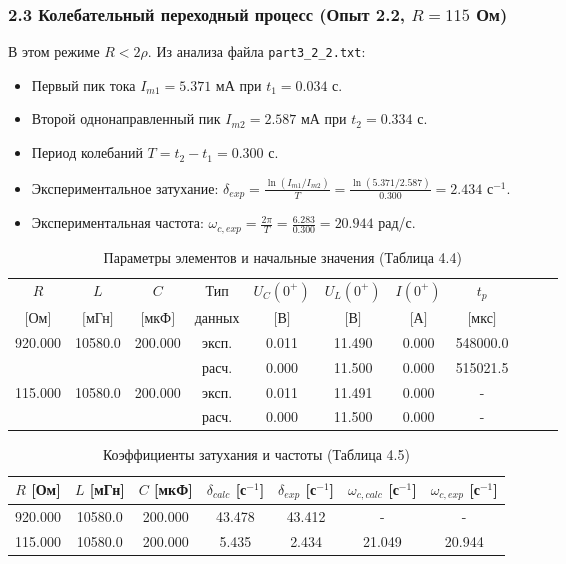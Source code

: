 \documentclass[a4paper,12pt]{article}
\begin{document}
\subsubsection*{2.3 Колебательный переходный процесс (Опыт 2.2, $R = 115$ Ом)}
В этом режиме $R < 2\rho$. Из анализа файла \texttt{part3\_2\_2.txt}:
\begin{itemize}
    \item Первый пик тока $I_{m1} = 5.371$ мА при $t_1 = 0.034$ с.
    \item Второй однонаправленный пик $I_{m2} = 2.587$ мА при $t_2 = 0.334$ с.
    \item Период колебаний $T = t_2 - t_1 = 0.300$ с.
    \item Экспериментальное затухание: $\delta_{exp} = \frac{\ln(I_{m1}/I_{m2})}{T} = \frac{\ln(5.371/2.587)}{0.300} = 2.434$ с$^{-1}$.
    \item Экспериментальная частота: $\omega_{c,exp} = \frac{2\pi}{T} = \frac{6.283}{0.300} = 20.944$ рад/с.
\end{itemize}

\begin{table}[H]
\centering
\caption{Параметры элементов и начальные значения (Таблица 4.4)}
\begin{tabular}{|c|c|c|c|c|c|c|c|c|c|c|}
\hline
$R$ & $L$ & $C$ & Тип & $U_C(0^+)$ & $U_L(0^+)$ & $I(0^+)$ & $t_p$ \\
$[$Ом$]$ & $[$мГн$]$ & $[$мкФ$]$ & данных & $[$В$]$ & $[$В$]$ & $[$А$]$ & $[$мкс$]$ \\
\hline
920.000 & 10580.0 & 200.000 & эксп. & 0.011 & 11.490 & 0.000 & 548000.0 \\
\hline
 &  &  & расч. & 0.000 & 11.500 & 0.000 & 515021.5 \\ 
\hline
115.000 & 10580.0 & 200.000 & эксп. & 0.011 & 11.491 & 0.000 & - \\
\hline
 &  &  & расч. & 0.000 & 11.500 & 0.000 & - \\
\hline
\end{tabular}
\end{table}

\begin{table}[H]
\centering
\caption{Коэффициенты затухания и частоты (Таблица 4.5)}
\begin{tabular}{|c|c|c|c|c|c|c|}
\hline
$R$ [Ом] & $L$ [мГн] & $C$ [мкФ] & $\delta_{calc}$ [с$^{-1}$] & $\delta_{exp}$ [с$^{-1}$] & $\omega_{c,calc}$ [с$^{-1}$] & $\omega_{c,exp}$ [с$^{-1}$] \\
\hline
920.000 & 10580.0 & 200.000 & 43.478 & 43.412 & - & - \\
\hline
115.000 & 10580.0 & 200.000 & 5.435 & 2.434 & 21.049 & 20.944 \\
\hline
\end{tabular}
\end{table}
\end{document}
